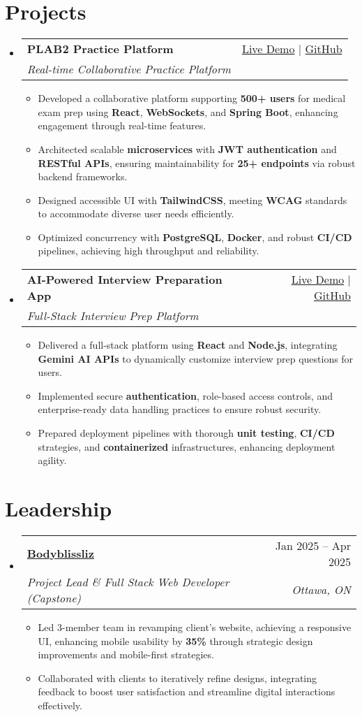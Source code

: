 \documentclass[letterpaper,11pt]{article}
\makeatletter
\newcommand{\resumeItem}[1]{\item\small{#1 \vspace{-2pt}}}
\newcommand{\resumeSubheading}[4]{
  \vspace{-1pt}\item
    \begin{tabular*}{0.97\textwidth}[t]{l@{\extracolsep{\fill}}r}
      \textbf{#1} & #2 \\
      \textit{\small#3} & \textit{\small #4} \\
    \end{tabular*}\vspace{-5pt}
}
\newcommand{\resumeSubHeadingListStart}{\begin{itemize}[leftmargin=*]}
\newcommand{\resumeSubHeadingListEnd}{\end{itemize}}
\newcommand{\resumeItemListStart}{\begin{itemize}}
\newcommand{\resumeItemListEnd}{\end{itemize}\vspace{-5pt}}
\makeatother
\begin{document}
\section{Projects}
  \resumeSubHeadingListStart
    \resumeSubheading
      {\textbf{PLAB2 Practice Platform}}{\href{https://plab2practice.com?utm_source=test1\&utm_medium=resume\&utm_campaign=job_application}{Live Demo} | \href{https://github.com/altansaid/plab2projectnew}{GitHub}}
      {Real-time Collaborative Practice Platform}{}
      \resumeItemListStart
        \resumeItem{Developed a collaborative platform supporting \textbf{500+ users} for medical exam prep using \textbf{React}, \textbf{WebSockets}, and \textbf{Spring Boot}, enhancing engagement through real-time features.}
        \resumeItem{Architected scalable \textbf{microservices} with \textbf{JWT authentication} and \textbf{RESTful APIs}, ensuring maintainability for \textbf{25+ endpoints} via robust backend frameworks.}
        \resumeItem{Designed accessible UI with \textbf{TailwindCSS}, meeting \textbf{WCAG} standards to accommodate diverse user needs efficiently.}
        \resumeItem{Optimized concurrency with \textbf{PostgreSQL}, \textbf{Docker}, and robust \textbf{CI/CD} pipelines, achieving high throughput and reliability.}
      \resumeItemListEnd

    \resumeSubheading
      {\textbf{AI-Powered Interview Preparation App}}{\href{https://interviewcoach-ai.vercel.app}{Live Demo} | \href{https://github.com/altansaid/interviewcoach-ai}{GitHub}}
      {Full-Stack Interview Prep Platform}{}
      \resumeItemListStart
        \resumeItem{Delivered a full-stack platform using \textbf{React} and \textbf{Node.js}, integrating \textbf{Gemini AI APIs} to dynamically customize interview prep questions for users.}
        \resumeItem{Implemented secure \textbf{authentication}, role-based access controls, and enterprise-ready data handling practices to ensure robust security.}
        \resumeItem{Prepared deployment pipelines with thorough \textbf{unit testing}, \textbf{CI/CD} strategies, and \textbf{containerized} infrastructures, enhancing deployment agility.}
      \resumeItemListEnd
  \resumeSubHeadingListEnd

\section{Leadership}
  \resumeSubHeadingListStart
    \resumeSubheading
      {\href{https://www.bodyblissliz.com}{Bodyblissliz}}{Jan 2025 -- Apr 2025}
      {Project Lead \& Full Stack Web Developer (Capstone)}{Ottawa, ON}
      \resumeItemListStart
        \resumeItem{Led 3-member team in revamping client's website, achieving a responsive UI, enhancing mobile usability by \textbf{35\%} through strategic design improvements and mobile-first strategies.}
        \resumeItem{Collaborated with clients to iteratively refine designs, integrating feedback to boost user satisfaction and streamline digital interactions effectively.}
      \resumeItemListEnd
  \resumeSubHeadingListEnd
\end{document}
